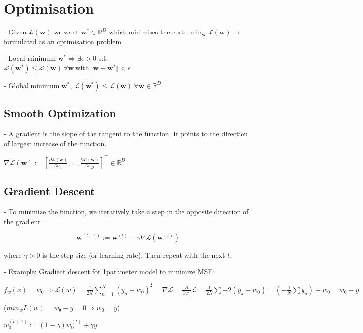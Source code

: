 \section*{Optimisation}

- Given $\mathcal{L}(\mathbf{w})$ we want $\mathbf{w^*} \in \mathbb{R}^D$ which minimises the cost: $\min_\mathbf{w} \mathcal{L}(\mathbf{w}) \rightarrow$ formulated as an optimisation problem

- Local minimum $\mathbf{w^*} \Rightarrow \exists \epsilon > 0$ s.t. \\
$\mathcal{L}(\mathbf{w^*}) \leq \mathcal{L}(\mathbf{w}) \ \forall \mathbf{w} \ \mathrm{with} \ \Vert \mathbf{w}-\mathbf{w^*} \Vert < \epsilon$

- Global minimum $\mathbf{w^*}$,
$\mathcal{L}(\mathbf{w^*}) \leq \mathcal{L}(\mathbf{w}) \ \forall \mathbf{w} \in \mathbb{R}^D$


\subsection*{Smooth Optimization}
- A gradient is the slope of the tangent to the function. It points to the direction of largest increase of the function.

$\nabla \mathcal{L}(\mathbf{w}):=\left[\frac{\partial \mathcal{L}(\mathbf{w})}{\partial w_{1}}, \ldots, \frac{\partial \mathcal{L}(\mathbf{w})}{\partial w_{D}}\right]^{\top} \in \mathbb{R}^{D}$

\subsection*{Gradient Descent}
- To minimize the function, we iteratively take a step in the opposite direction of the gradient

$$
\mathbf{w}^{(t+1)}:=\mathbf{w}^{(t)}-\gamma \nabla \mathcal{L}\left(\mathbf{w}^{(t)}\right)
$$

where $\gamma>0$ is the step-size (or learning rate). Then repeat with the next $t$.

- Example: Gradient descent for 1parameter model to minimize MSE:

$f_w(x)=w_0\Rightarrow\mathcal{L}(w)=\frac1{2N}\sum_{n=1}^N\left(y_n-w_0\right)^2=\nabla \mathcal{L}=\frac\partial{\partial w_0}\mathcal{L}=\frac{1}{2N}\sum-2(y_{n}-w_{0})=(-\frac{1}{N}\sum y_{n})+w_{0}=w_0-\bar{y}$

($min_{w}L(w)=w_{0}-\bar{y}=0\Rightarrow w_{0}=\bar{y}$)

$
w_{0}^{(t+1)}:=(1-\gamma) w_{0}^{(t)}+\gamma \bar{y}
$


